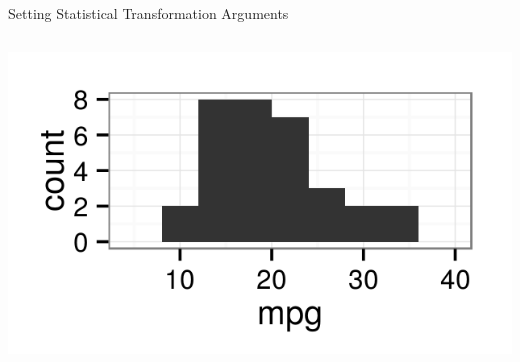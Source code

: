 \documentclass[table,smaller]{beamer}
\begin{document}
\begin{frame}[fragile,label=sec-3-2]{Setting Statistical Transformation Arguments}
\begin{columns}
\begin{column}{0.5\textwidth}
\begin{columns}
\begin{block}{}
\includegraphics[width=.9\linewidth]{images/ChangeStatBinArgs.png}
\end{block} \end{columns}
\end{column}
\end{columns}
\end{frame}
\end{document}
